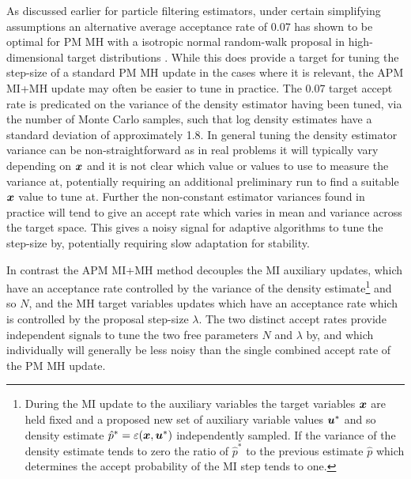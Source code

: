As discussed earlier for particle filtering estimators, under certain simplifying assumptions an alternative average acceptance rate of 0.07 has shown to be optimal for \ac{PM} \ac{MH} with a isotropic normal random-walk proposal in high-dimensional target distributions \citep{sherlock2015efficiency}. While this does provide a target for tuning the step-size of a standard \ac{PM} \ac{MH} update in the cases where it is relevant, the \ac{APM} \ac{MI}+\ac{MH} update may often be easier to tune in practice. The 0.07 target accept rate is predicated on the variance of the density estimator having been tuned, via the number of Monte Carlo samples, such that log density estimates have a standard deviation of approximately 1.8. In general tuning the density estimator variance can be non-straightforward as in real problems it will typically vary depending on $\boldsymbol{x}$ and it is not clear which value or values to use to measure the variance at, potentially requiring an additional preliminary run to find a suitable $\boldsymbol{x}$ value to tune at. Further the non-constant estimator variances found in practice will tend to give an accept rate which varies in mean and variance across the target space. This gives a noisy signal for adaptive algorithms to tune the step-size by, potentially requiring slow adaptation for stability. 

In contrast the \ac{APM} \ac{MI}+\ac{MH} method decouples the \ac{MI} auxiliary updates, which have an acceptance rate controlled by the variance of the density estimate\footnote{During the \ac{MI} update to the auxiliary variables the target variables $\boldsymbol{x}$ are held fixed and a proposed new set of auxiliary variable values $\boldsymbol{u}^*$ and so density estimate $\hat{p}^* = \varepsilon(\boldsymbol{x},\boldsymbol{u}^*)$ independently sampled. If the variance of the density estimate tends to zero the ratio of $\hat{p}^*$ to the previous estimate $\hat{p}$ which determines the accept probability of the \ac{MI} step tends to one.} and so $N$, and the \ac{MH} target variables updates which have an acceptance rate which is controlled by the proposal step-size $\lambda$.  The two distinct accept rates provide independent signals to tune the two free parameters $N$ and $\lambda$ by, and which individually will generally be less noisy than the single combined accept rate of the \ac{PM} \ac{MH} update. %

